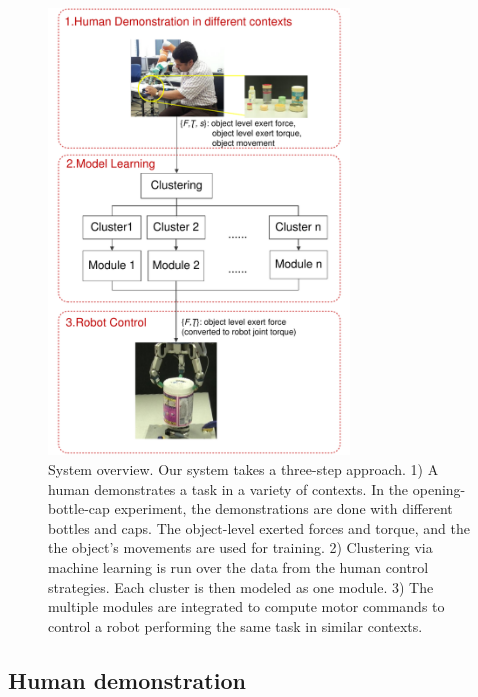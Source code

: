 \begin{figure}
  \centering
   \includegraphics[width=8cm]{./fig/overview5.pdf}
   \caption{ \scriptsize{System overview. Our system takes a
       three-step approach. 1) A human demonstrates a task in a
       variety of contexts. In the opening-bottle-cap experiment, the
       demonstrations are done with different bottles and caps. The
       object-level exerted forces and torque, and the the object's
       movements are used for training. 2) Clustering via machine
       learning is run over the data from the human control
       strategies. Each cluster is then modeled as one module. 3) The
       multiple modules are integrated to compute motor commands to
       control a robot performing the same task in similar contexts.}  }
\label{fig:overview}
\end{figure}

\subsection{Human demonstration}
\label{sec:demo}


